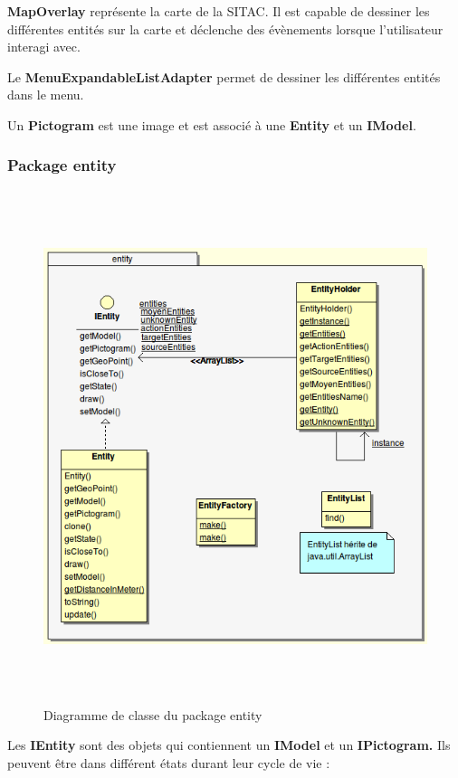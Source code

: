 \documentclass{article}
\begin{document}
\textbf{MapOverlay} représente la carte de la SITAC. Il est capable de dessiner les différentes entités sur la carte et déclenche des évènements lorsque l’utilisateur interagi avec.

Le \textbf{MenuExpandableListAdapter} permet de dessiner les différentes entités dans le menu.

Un \textbf{Pictogram} est une image et est associé à une \textbf{Entity} et un \textbf{IModel}.

\newpage
\subsubsection{Package entity}
\begin{figure}[htbp]
\begin{center}
\includegraphics[width=410pt, height=424pt]{doc_dev-fig010.png}
\caption{Diagramme de classe du package entity}
\end{center}
\end{figure}

Les \textbf{IEntity} sont des objets qui contiennent un \textbf{IModel } et un \textbf{IPictogram.} Ils peuvent être dans différent états durant leur cycle de vie :
\end{document}
